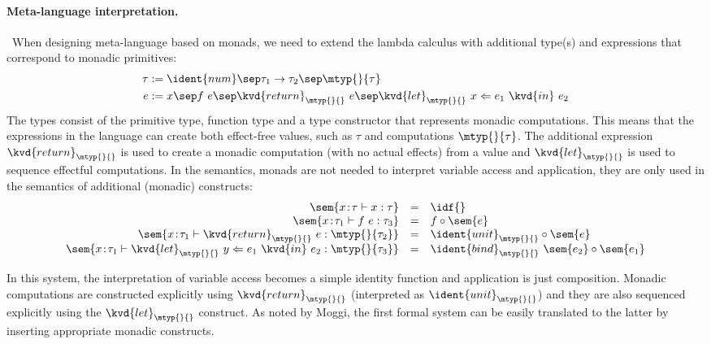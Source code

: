 
\paragraph{Meta-language interpretation.} ~When designing meta-language based on monads, we need to
extend the lambda calculus with additional type(s) and expressions that correspond to monadic
primitives:
%
\begin{align*}
\tau &:= \ident{num} \sep \tau_1 \rightarrow \tau_2 \sep \mtyp{}{\tau} \\
   e &:= x \sep f~e \sep \kvd{return}_\mtyp{}{}~e \sep \kvd{let}_\mtyp{}{}~x \Leftarrow e_1~\kvd{in}~e_2
\end{align*}
%
The types consist of the primitive type, function type and a type constructor that
represents monadic computations. This means that the expressions in the language can create both
effect-free values, such as $\tau$ and computations $\mtyp{}{\tau}$. The additional expression
$\kvd{return}_\mtyp{}{}$ is used to create a monadic computation (with no actual effects) from a
value and $\kvd{let}_\mtyp{}{}$ is used to sequence effectful computations. In the semantics,
monads are not needed to interpret variable access and application, they are only used in the
semantics of additional (monadic) constructs:
%
\begin{equation*}
\begin{array}{rcl}
\sem{x\!:\!\tau \vdash x : \tau} &=& \idf{}\\
\sem{x\!:\!\tau_1 \vdash f~e : \tau_3} &=& f \circ \sem{e}\\
\sem{x\!:\!\tau_1 \vdash \kvd{return}_\mtyp{}{}~e : \mtyp{}{\tau_2}} &=& \ident{unit}_\mtyp{}{} \circ \sem{e}\\
\sem{x\!:\!\tau_1 \vdash \kvd{let}_\mtyp{}{}~y \Leftarrow e_1~\kvd{in}~e_2 : \mtyp{}{\tau_3}} &=&
  \ident{bind}_\mtyp{}{}~\sem{e_2} \circ \sem{e_1}
\end{array}
\end{equation*}

\noindent
In this system, the interpretation of variable access becomes a simple identity function and
application is just composition. Monadic computations are constructed explicitly using
$\kvd{return}_\mtyp{}{}$ (interpreted as $\ident{unit}_\mtyp{}{}$) and they are also sequenced
explicitly using the $\kvd{let}_\mtyp{}{}$ construct. As noted by Moggi, the first formal system
can be easily translated to the latter by inserting appropriate monadic constructs.


